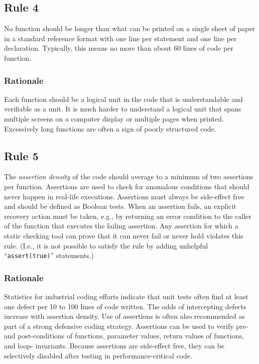 \documentclass[11pt,oneside]{article}
\begin{document}
\subsection{Rule 4}

No function should be longer than what can be printed on a single sheet of
paper in a standard reference format with one line per statement and one line
per declaration. Typically, this means no more than about 60 lines of code per
function.

\subsubsection*{Rationale}

Each function should be a logical unit in the code that is understandable and
verifiable as a unit. It is much harder to understand a logical unit that spans
multiple screens on a computer display or multiple pages when printed.
Excessively long functions are often a sign of poorly structured code.

\subsection{Rule 5}

The \emph{assertion density} of the code should average to a minimum of two
assertions per function. Assertions are used to check for anomalous conditions
that should never happen in real-life executions. Assertions must always be
side-effect free and should be defined as Boolean tests. When an assertion
fails, an explicit recovery action must be taken, e.g., by returning an error
condition to the caller of the function that executes the failing assertion.
Any assertion for which a static checking tool can prove that it can never fail
or never hold violates this rule. (I.e., it is not possible to satisfy the rule
by adding unhelpful ``\texttt{assert(true)}'' statements.)

\subsubsection*{Rationale}

Statistics for industrial coding efforts indicate that unit tests often find at
least one defect per 10 to 100 lines of code written. The odds of intercepting
defects increase with assertion density. Use of assertions is often also
recommended as part of a strong defensive coding strategy.  Assertions can be
used to verify pre-and post-conditions of functions, parameter values, return
values of functions, and loop- invariants. Because assertions are side-effect
free, they can be selectively disabled after testing in performance-critical
code.
\end{document}

